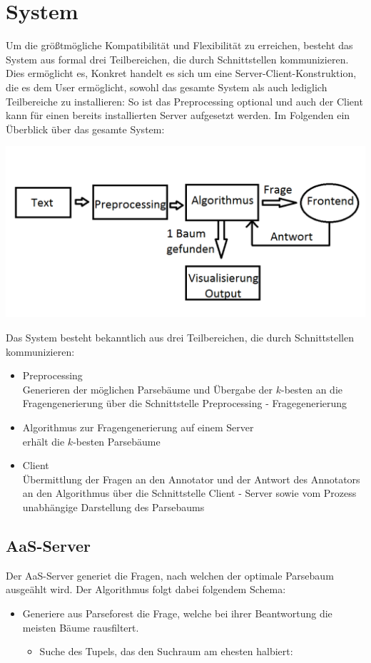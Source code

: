\documentclass{scrartcl}
\begin{document}
\section{System}
\label{sec:System}
Um die grö{\ss}tmögliche Kompatibilität und Flexibilität zu erreichen, besteht das System aus formal drei Teilbereichen, die durch Schnittstellen kommunizieren. Dies ermöglicht es, 
Konkret handelt es sich um eine Server-Client-Konstruktion, die es dem User ermöglicht, sowohl das gesamte System als auch lediglich Teilbereiche zu installieren: So ist das Preprocessing optional und auch der Client kann für einen bereits installierten Server aufgesetzt werden.
Im Folgenden ein Überblick über das gesamte System:
\begin{center}
 \includegraphics[scale=0.4]{Grafik}
 \end{center}
Das System besteht bekanntlich aus drei Teilbereichen, die durch Schnittstellen kommunizieren:
\begin{itemize}
\item Preprocessing\\Generieren der möglichen Parsebäume und Übergabe der $k$-besten an die Fragengenerierung über die Schnittstelle Preprocessing - Fragegenerierung
\item Algorithmus zur Fragengenerierung auf einem Server\\erhält die $k$-besten Parsebäume 
\item Client\\Übermittlung der
Fragen an den Annotator und der Antwort des Annotators an den Algorithmus über die Schnittstelle Client - Server sowie vom Prozess unabhängige Darstellung des Parsebaums 
\end{itemize}

\subsection{AaS-Server}
\label{sub:AaS-Server}
Der AaS-Server generiet die Fragen, nach welchen der optimale Parsebaum ausgeählt wird. Der Algorithmus folgt dabei folgendem Schema:
    \begin{itemize}
        \item Generiere aus Parseforest die Frage, welche bei ihrer Beantwortung die meisten Bäume rausfiltert.
            \begin{itemize}
                \item Suche des Tupels, das den Suchraum am ehesten halbiert:
            \end{itemize}
    \end{itemize}
\end{document}
